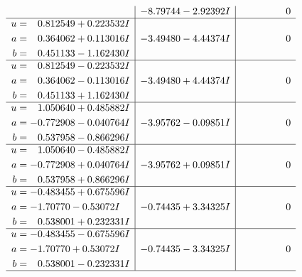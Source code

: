 \documentclass[1p]{elsarticle_modified}
\theoremstyle{definition}
\begin{document}
$$\begin{array}{c|c|c}
 & -8.79744 - 2.92392 I & \phantom{-0.000000 } 0 \\ \hline\begin{aligned}
u &= \phantom{-}0.812549 + 0.223532 I \\
a &= \phantom{-}0.364062 + 0.113016 I \\
b &= \phantom{-}0.451133 - 1.162430 I\end{aligned}
 & -3.49480 - 4.44374 I & \phantom{-0.000000 } 0 \\ \hline\begin{aligned}
u &= \phantom{-}0.812549 - 0.223532 I \\
a &= \phantom{-}0.364062 - 0.113016 I \\
b &= \phantom{-}0.451133 + 1.162430 I\end{aligned}
 & -3.49480 + 4.44374 I & \phantom{-0.000000 } 0 \\ \hline\begin{aligned}
u &= \phantom{-}1.050640 + 0.485882 I \\
a &= -0.772908 - 0.040764 I \\
b &= \phantom{-}0.537958 - 0.866296 I\end{aligned}
 & -3.95762 - 0.09851 I & \phantom{-0.000000 } 0 \\ \hline\begin{aligned}
u &= \phantom{-}1.050640 - 0.485882 I \\
a &= -0.772908 + 0.040764 I \\
b &= \phantom{-}0.537958 + 0.866296 I\end{aligned}
 & -3.95762 + 0.09851 I & \phantom{-0.000000 } 0 \\ \hline\begin{aligned}
u &= -0.483455 + 0.675596 I \\
a &= -1.70770 - 0.53072 I \\
b &= \phantom{-}0.538001 + 0.232331 I\end{aligned}
 & -0.74435 + 3.34325 I & \phantom{-0.000000 } 0 \\ \hline\begin{aligned}
u &= -0.483455 - 0.675596 I \\
a &= -1.70770 + 0.53072 I \\
b &= \phantom{-}0.538001 - 0.232331 I\end{aligned}
 & -0.74435 - 3.34325 I & \phantom{-0.000000 } 0\\
 \hline 
 \end{array}$$\newpage$$\begin{array}{c|c|c}  

\end{array}$$
\end{document}
